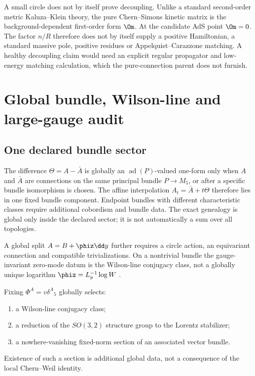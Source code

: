 A small circle does not by itself prove decoupling.  Unlike a standard second-order metric Kaluza--Klein theory, the pure Chern--Simons kinetic matrix is the background-dependent first-order form $\Om$.  At the candidate AdS point $\Om=0$.  The factor $n/R$ therefore does not by itself supply a positive Hamiltonian, a standard massive pole, positive residues or Appelquist--Carazzone matching.  A healthy decoupling claim would need an explicit regular propagator and low-energy matching calculation, which the pure-connection parent does not furnish.

\section{Global bundle, Wilson-line and large-gauge audit}
\label{sec:global}

\subsection{One declared bundle sector}

The difference $\Theta=A-\bar A$ is globally an $\operatorname{ad}(P)$-valued one-form only when $A$ and $\bar A$ are connections on the same principal bundle $P\to M_5$, or after a specific bundle isomorphism is chosen.  The affine interpolation $A_t=\bar A+t\Theta$ therefore lies in one fixed bundle component.  Endpoint bundles with different characteristic classes require additional cobordism and bundle data.  The exact genealogy is global only inside the declared sector; it is not automatically a sum over all topologies.

A global split $A=B+\phiz\dd y$ further requires a circle action, an equivariant connection and compatible trivializations.  On a nontrivial bundle the gauge-invariant zero-mode datum is the Wilson-line conjugacy class, not a globally unique logarithm $\phiz=L_y^{-1}\log W$ \citep{Hosotani2005}.

Fixing $\Phi^A=v\delta^A{}_5$ globally selects:
\begin{enumerate}
\item a Wilson-line conjugacy class;
\item a reduction of the $SO(3,2)$ structure group to the Lorentz stabilizer;
\item a nowhere-vanishing fixed-norm section of an associated vector bundle.
\end{enumerate}
Existence of such a section is additional global data, not a consequence of the local Chern--Weil identity.

